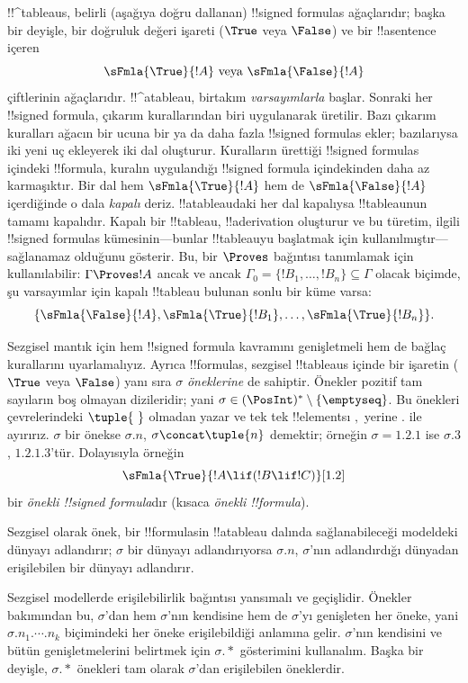 



!!^{tableau}s, belirli (aşağıya doğru dallanan) !!{signed formula}s
ağaçlarıdır; başka bir deyişle, bir doğruluk değeri işareti ($\True$ veya
$\False$) ve bir !!a{sentence} içeren
\[
\sFmla{\True}{!A} \text{ veya } \sFmla{\False}{!A}
\]
çiftlerinin ağaçlarıdır. !!^a{tableau}, birtakım \emph{varsayımlarla}
başlar. Sonraki her !!{signed formula}, çıkarım kurallarından biri uygulanarak
üretilir. Bazı çıkarım kuralları ağacın bir ucuna bir ya da daha fazla
!!{signed formula}s ekler; bazılarıysa iki yeni uç ekleyerek iki dal oluşturur.
Kuralların ürettiği !!{signed formula}s içindeki !!{formula}, kuralın
uygulandığı !!{signed formula} içindekinden daha az karmaşıktır. Bir dal hem
$\sFmla{\True}{!A}$ hem de $\sFmla{\False}{!A}$ içerdiğinde o dala
\emph{kapalı} deriz. !!a{tableau}{}daki her dal kapalıysa !!{tableau}{}nun tamamı
kapalıdır. Kapalı bir !!{tableau}, !!a{derivation} oluşturur ve bu türetim,
ilgili !!{signed formula}s kümesinin---bunlar !!{tableau}{}yu başlatmak için
kullanılmıştır---sağlanamaz olduğunu gösterir. Bu, bir $\Proves$ bağıntısı
tanımlamak için kullanılabilir:
$\Gamma \Proves !A$ ancak ve ancak $\Gamma_0 = \{!B_1,
\dots, !B_n\} \subseteq \Gamma$ olacak biçimde, şu varsayımlar için kapalı
!!{tableau} bulunan sonlu bir küme varsa:
\[
\{\sFmla{\False}{!A}, \sFmla{\True}{!B_1}, \dots, \sFmla{\True}{!B_n}\}.
\]

Sezgisel mantık için hem !!{signed formula} kavramını genişletmeli hem de
bağlaç kurallarını uyarlamalıyız. Ayrıca !!{formula}s, sezgisel !!{tableau}s
içinde bir işaretin ($\True$ veya $\False$) yanı sıra $\sigma$
\emph{öneklerine} de sahiptir. Önekler pozitif tam sayıların boş olmayan
dizileridir; yani
$\sigma \in (\PosInt)^* \setminus \{\emptyseq\}$. Bu önekleri çevrelerindeki
$\tuple{\ }$ olmadan yazar ve tek tek !!{element}s{}ı $,$ yerine $.$ ile
ayırırız. $\sigma$ bir önekse $\sigma.n$, $\sigma \concat \tuple{n}$
demektir; örneğin $\sigma = 1.2.1$ ise $\sigma.3$, $1.2.1.3$'tür.
Dolayısıyla örneğin
\[
\sFmla{\True}{!A \lif (!B \lif !C)}[1.2]
\]
bir \emph{önekli !!{signed formula}}dır (kısaca \emph{önekli
  !!{formula}}).

Sezgisel olarak önek, bir !!{formula}s{}in !!a{tableau} dalında
sağlanabileceği modeldeki dünyayı adlandırır; $\sigma$ bir dünyayı
adlandırıyorsa $\sigma.n$, $\sigma$'nın adlandırdığı dünyadan erişilebilen
bir dünyayı adlandırır.

Sezgisel modellerde erişilebilirlik bağıntısı yansımalı ve geçişlidir. Önekler
bakımından bu, $\sigma$'dan hem $\sigma$'nın kendisine hem de $\sigma$'yı
genişleten her öneke, yani $\sigma.n_1.\cdots.n_k$ biçimindeki her öneke
erişilebildiği anlamına gelir. $\sigma$'nın kendisini ve bütün genişletmelerini belirtmek
için $\sigma.*$ gösterimini kullanalım. Başka bir deyişle, $\sigma.*$
önekleri tam olarak $\sigma$'dan erişilebilen öneklerdir.

